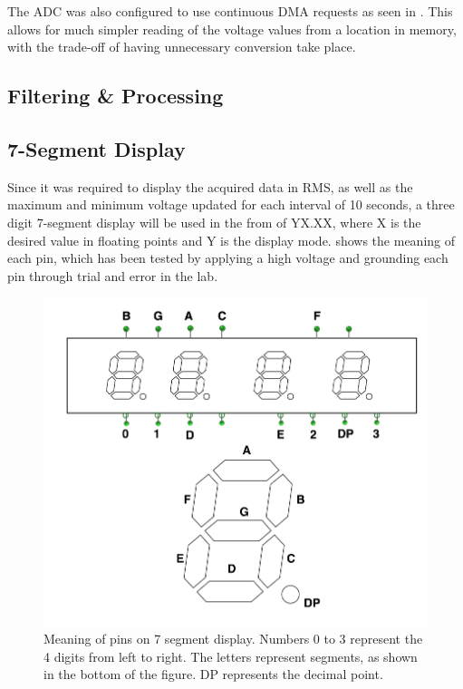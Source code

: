 \documentclass[a4paper,titlepage]{article}
\begin{document}
The ADC was also configured to use continuous DMA requests as seen in . This allows for much simpler reading of the voltage values from a location in memory, with the trade-off of having unnecessary conversion take place.


\subsection{Filtering \& Processing}

\subsection{7-Segment Display}
Since it was required to display the acquired data in RMS, as well as the maximum and minimum voltage updated for each interval of 10 seconds, a three digit 7-segment display will be used in the from of YX.XX, where X is the desired value in floating points and Y is the display mode.  shows the meaning of each pin, which has been tested by applying a high voltage and grounding each pin through trial and error in the lab.
\begin{figure}[!htb]
  \centering
  \includegraphics[width=\columnwidth]{figures/7seg_display.PNG}
  \caption
  {Meaning of pins on 7 segment display. Numbers 0 to 3 represent the 4 digits from left to right. The letters represent segments, as shown in the bottom of the figure. DP represents the decimal point.}
  \label{fig:7_segment}
\end{figure}
\end{document}
